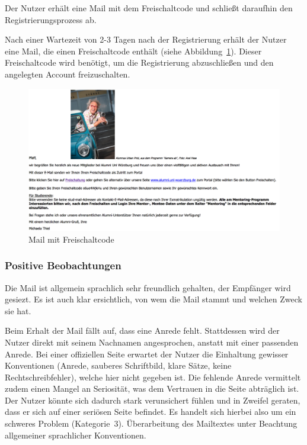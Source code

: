 \newpage
{}
\label{subsec:freischaltung}
Der Nutzer erhält eine Mail mit dem Freischaltcode und schließt daraufhin den Registrierungsprozess ab.

Nach einer Wartezeit von 2-3 Tagen nach der Registrierung erhält der Nutzer eine Mail, die einen Freischaltcode enthält (siehe Abbildung~\ref{fig:regmail}). Dieser Freischaltcode wird benötigt, um die Registrierung abzuschließen und den angelegten Account freizuschalten.

\begin{figure}
	\centering
		\includegraphics[width=\textwidth]{figures/regmail.jpg}
	\caption{Mail mit Freischaltcode}
	\label{fig:regmail}
\end{figure}

\subsubsection*{Positive Beobachtungen}
\label{subsubsec:freischaltung_mail_positiv}
Die Mail ist allgemein sprachlich sehr freundlich gehalten, der Empfänger wird gesiezt. Es ist auch klar ersichtlich, von wem die Mail stammt und welchen Zweck sie hat.

{
Beim Erhalt der Mail fällt auf, dass eine Anrede fehlt. Stattdessen wird der Nutzer direkt mit seinem Nachnamen angesprochen, anstatt mit einer passenden Anrede.
}
{
Bei einer offiziellen Seite erwartet der Nutzer die Einhaltung gewisser Konventionen (Anrede, sauberes Schriftbild, klare Sätze, keine Rechtschreibfehler), welche hier nicht gegeben ist. Die fehlende Anrede vermittelt zudem einen Mangel an Seriosität, was dem Vertrauen in die Seite abträglich ist. Der Nutzer könnte sich dadurch stark verunsichert fühlen und in Zweifel geraten, dass er sich auf einer seriösen Seite befindet. Es handelt sich hierbei also um ein schweres Problem (Kategorie~3).
}
{
Überarbeitung des Mailtextes unter Beachtung allgemeiner sprachlicher Konventionen.
}
\label{prob:frei:mailanrede}

